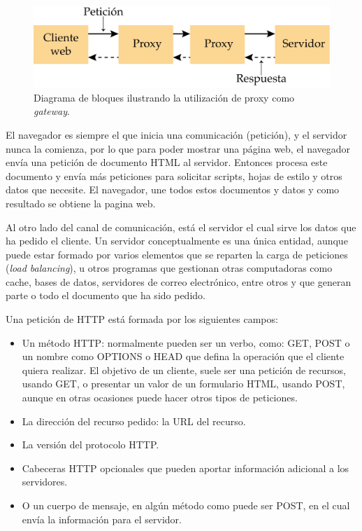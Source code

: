 \begin{figure}[htpb]
	\centering
	\includegraphics[scale=.80]{./Figures/server-proxy.png}
	\caption[Utilización de proxy como  \textit{gateway}.  ]{Diagrama de bloques ilustrando la utilización de proxy como  \textit{gateway}.}
	\label{fig:server-proxy}
\end{figure}


El navegador es siempre el que inicia una comunicación (petición), y el servidor nunca la comienza, por lo que para poder mostrar una página web, el navegador envía una petición de documento HTML al servidor. Entonces procesa este documento y envía más peticiones para solicitar scripts, hojas de estilo y otros datos que necesite. El navegador, une todos estos documentos y datos y como resultado se obtiene la pagina web. 

Al otro lado del canal de comunicación, está el servidor el cual sirve los datos que ha pedido el cliente. Un servidor conceptualmente es una única entidad, aunque puede estar formado por varios elementos que se reparten la carga de peticiones (\textit{load balancing}), u otros programas que gestionan otras computadoras como cache, bases de datos, servidores de correo electrónico, entre otros y que generan parte o todo el documento que ha sido pedido. 

Una petición de HTTP está formada por los siguientes campos:

\begin{itemize}
	\item Un método HTTP: normalmente pueden ser un verbo, como: GET, POST o un nombre como OPTIONS o HEAD que defina la operación que el cliente quiera realizar. El objetivo de un cliente, suele ser una petición de recursos, usando GET, o presentar un valor de un formulario HTML, usando POST, aunque en otras ocasiones puede hacer otros tipos de peticiones. 
	
	\item La dirección del recurso pedido: la URL del recurso.
	
	\item La versión del protocolo HTTP.
	
	\item Cabeceras HTTP opcionales que pueden aportar información adicional a los servidores.
	
	\item O un cuerpo de mensaje, en algún método como puede ser POST, en el cual envía la información para el servidor.
	
\end{itemize}

